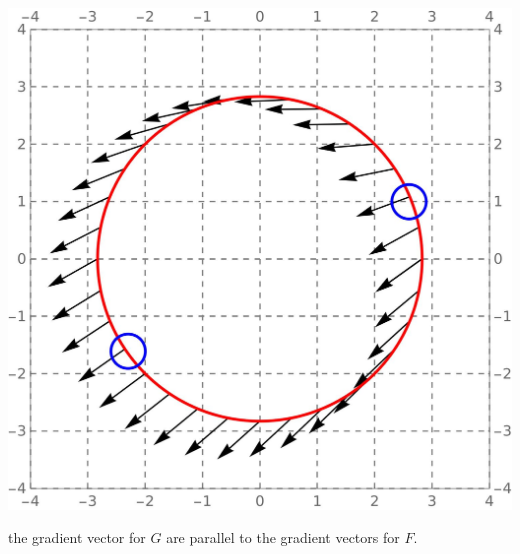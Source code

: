 \documentclass{ximera}
\begin{document}
\begin{example}
\begin{explanation}
\begin{feedback}[correct]
\begin{image}
        \includegraphics{curveVectors2Feedback.jpg}
      \end{image}
      the gradient vector for $G$ are parallel to the gradient vectors
      for $F$.
    \end{feedback}
  \end{explanation}
\end{example}
\end{document}
